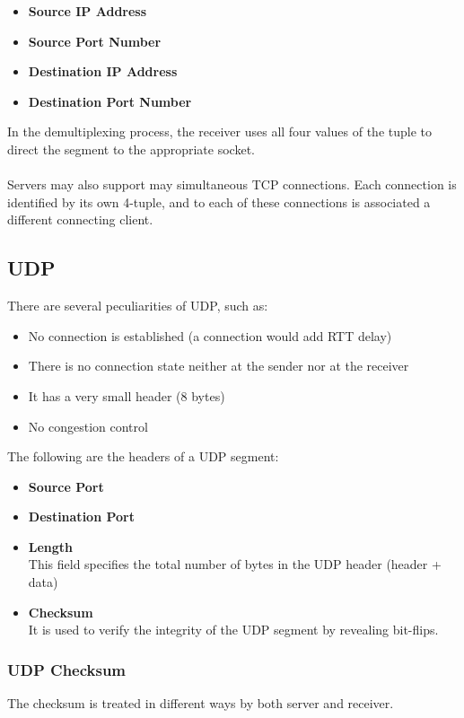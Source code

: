 \documentclass{article}
\begin{document}
\begin{itemize}
	\item \textbf{Source IP Address}
	\item \textbf{Source Port Number}
	\item \textbf{Destination IP Address}
	\item \textbf{Destination Port Number}
\end{itemize}
In the demultiplexing process, the receiver uses all four values of the tuple to direct the segment to the appropriate socket. \\ \\
Servers may also support may simultaneous TCP connections. Each connection is identified by its own 4-tuple, and to each of these connections is associated a different connecting client.

\subsection{UDP}
There are several peculiarities of UDP, such as:

\begin{itemize}
	\item No connection is established (a connection would add RTT delay)
	\item There is no connection state neither at the sender nor at the receiver
	\item It has a very small header (8 bytes)
	\item No congestion control
\end{itemize}
The following are the headers of a UDP segment:

\begin{itemize}
	\item \textbf{Source Port}
	\item \textbf{Destination Port}
	\item \textbf{Length}
	\vspace{.2cm} \\
	This field specifies the total number of bytes in the UDP header (header + data)
	\item \textbf{Checksum}
	\vspace{.2cm} \\
	It is used to verify the integrity of the UDP segment by revealing bit-flips.
\end{itemize}

\subsubsection{UDP Checksum}
The checksum is treated in different ways by both server and receiver.
\end{document}
